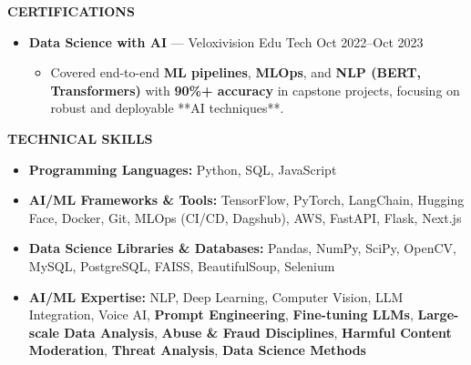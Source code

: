 \documentclass[a4paper,10pt]{article}
\newcommand{\resheading}[1]{%
  \vspace{1em}%
  \noindent\colorbox{mygrey}{%
    \parbox{\dimexpr\linewidth-2\fboxsep\relax}{%
      \textbf{#1}%
    }%
  }%
  \vspace{0.6em}%
}
\begin{document}
\resheading{CERTIFICATIONS}
\vspace{0.4em}
\begin{itemize}
  \item \textbf{Data Science with AI} — Veloxivision Edu Tech \hfill Oct 2022–Oct 2023
  \begin{itemize}
    \item Covered end-to-end \textbf{ML pipelines}, \textbf{MLOps}, and \textbf{NLP (BERT, Transformers)} with \textbf{90\%+ accuracy} in capstone projects, focusing on robust and deployable **AI techniques**.
  \end{itemize}
\end{itemize}

\resheading{TECHNICAL SKILLS}
\vspace{0.4em}
\begin{itemize}
  \item \textbf{Programming Languages:} Python, SQL, JavaScript
  \item \textbf{AI/ML Frameworks \& Tools:} TensorFlow, PyTorch, LangChain, Hugging Face, Docker, Git, MLOps (CI/CD, Dagshub), AWS, FastAPI, Flask, Next.js
  \item \textbf{Data Science Libraries \& Databases:} Pandas, NumPy, SciPy, OpenCV, MySQL, PostgreSQL, FAISS, BeautifulSoup, Selenium
  \item \textbf{AI/ML Expertise:} NLP, Deep Learning, Computer Vision, LLM Integration, Voice AI, \textbf{Prompt Engineering}, \textbf{Fine-tuning LLMs}, \textbf{Large-scale Data Analysis}, \textbf{Abuse \& Fraud Disciplines}, \textbf{Harmful Content Moderation}, \textbf{Threat Analysis}, \textbf{Data Science Methods}
\end{itemize}
\end{document}
